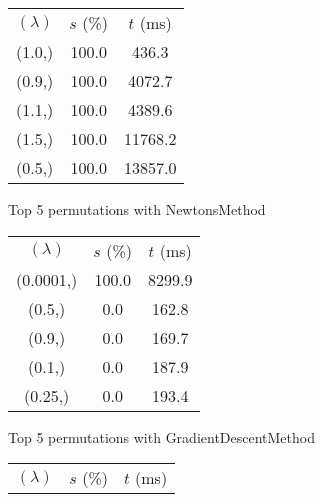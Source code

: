 \begin{figure}[H]
\label{fig:param_comp_MatrixSquareSum_ConstantSearch}
\begin{subfigure}[ht]{.5\textwidth}
\begin{tabular}{|c|c|c|}
\hline
\rowcolor{gray!25}
\multicolumn{3}{|c|}{NewtonsMethod} \\
\hline
\rowcolor{gray!25}
$(\lambda)$ & $s$ (\%) & $t$ (ms) \\
\hline
(1.0,) & 100.0 & 436.3 \\
(0.9,) & 100.0 & 4072.7 \\
(1.1,) & 100.0 & 4389.6 \\
(1.5,) & 100.0 & 11768.2 \\
(0.5,) & 100.0 & 13857.0 \\
\hline
\end{tabular}
\caption{Top 5 permutations with NewtonsMethod}
\label{subfig:param_comp_MatrixSquareSum_NewtonsMethod_ConstantSearch}
\end{subfigure}
\hfill
\begin{subfigure}[ht]{.5\textwidth}
\begin{tabular}{|c|c|c|}
\hline
\rowcolor{gray!25}
\multicolumn{3}{|c|}{GradientDescentMethod} \\
\hline
\rowcolor{gray!25}
$(\lambda)$ & $s$ (\%) & $t$ (ms) \\
\hline
(0.0001,) & 100.0 & 8299.9 \\
(0.5,) & 0.0 & 162.8 \\
(0.9,) & 0.0 & 169.7 \\
(0.1,) & 0.0 & 187.9 \\
(0.25,) & 0.0 & 193.4 \\
\hline
\end{tabular}
\caption{Top 5 permutations with GradientDescentMethod}
\label{subfig:param_comp_MatrixSquareSum_GradientDescentMethod_ConstantSearch}
\end{subfigure}
\hfill
\begin{subfigure}[ht]{.5\textwidth}
\begin{tabular}{|c|c|c|}
\hline
\rowcolor{gray!25}
\multicolumn{3}{|c|}{ConjugateGradientMethod} \\
\hline
\rowcolor{gray!25}
$(\lambda)$ & $s$ (\%) & $t$ (ms) \\

\end{tabular}
\end{subfigure}
\end{figure}
